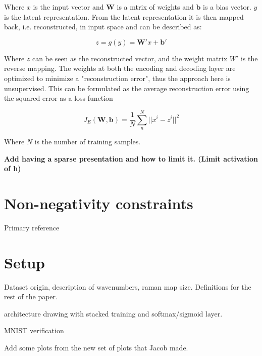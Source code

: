 \documentclass{article}
\begin{document}
Where $x$ is the input vector and $\mathbf{W}$ is a mtrix of weights and $\mathbf{b}$ is a bias vector. $y$ is the latent representation. From the latent representation it is then mapped back, i.e. reconstructed, in input space and can be described as:

\begin{equation}
z = g(y) = \mathbf{W'}x + \mathbf{b'}
\end{equation}

Where $z$ can be seen as the reconstructed vector, and the weight matrix $W'$ is the reverse mapping. The weights at both the encoding and decoding layer are optimized to minimize a "reconstruction error", thus the approach here is unsupervised. This can be formulated as the average reconstruction error using the squared error as a loss function

\begin{equation}
J_E(\mathbf{W},\mathbf{b}) = \frac{1}{N} \sum_n^N || x^i - z^i || ^2
\end{equation}

Where $N$ is the number of training samples. 

\textbf{Add having a sparse presentation and how to limit it. (Limit activation of h)}

\section{Non-negativity constraints}
\label{sec:prior}

%



Primary reference \cite{Hosseini-Asl2016}

\section{Setup}
\label{sec:setup}


Dataset origin, description of wavenumbers, raman map size. Definitions for the rest of the paper.

architecture drawing with stacked training and softmax/sigmoid layer.

MNIST verification

Add some plots from the new set of plots that Jacob made.
\end{document}
